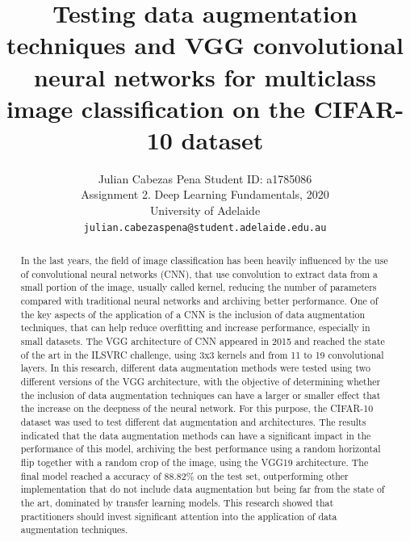 \documentclass[10pt,twocolumn,letterpaper]{article}
\begin{document}
\title{Testing data augmentation techniques and VGG convolutional neural networks for multiclass image classification on the CIFAR-10 dataset}

\author{Julian Cabezas Pena Student ID: a1785086\\
Assignment 2. Deep Learning Fundamentals, 2020 \\
University of Adelaide\\
{\tt\small julian.cabezaspena@student.adelaide.edu.au}
}

\maketitle

\begin{abstract}
	
In the last years, the field of image classification has been heavily influenced by the use of convolutional neural networks (CNN), that use convolution to extract data from a small portion of the image, usually called kernel, reducing the number of parameters compared with traditional neural networks and archiving better performance. One of the key aspects of the application of a CNN is the inclusion of data augmentation techniques, that can help reduce overfitting and increase performance, especially in small datasets.
The VGG architecture of CNN appeared in 2015 and reached the state of the art in the ILSVRC challenge, using 3x3 kernels and from 11 to 19 convolutional layers. In this research, different data augmentation methods were tested using two different versions of the VGG architecture, with the objective of determining whether the inclusion of data augmentation techniques can have a larger or smaller effect that the increase on the deepness of the neural network. For this purpose, the CIFAR-10 dataset was used to test different dat augmentation and architectures. The results indicated that the data augmentation methods can have a significant impact in the performance of this model, archiving the best performance using a random horizontal flip together with a random crop of the image, using the VGG19 architecture. The final model reached a accuracy of 88.82\% on the test set, outperforming other implementation that do not include data augmentation but being far from the state of the art, dominated by transfer learning models. This research showed that practitioners should invest significant attention into the application of data augmentation techniques.

\end{abstract}
\end{document}

